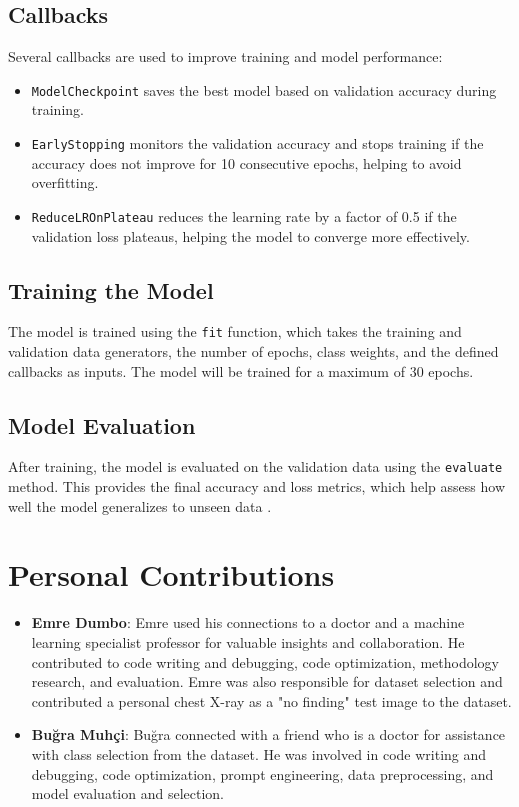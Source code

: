 \documentclass[journal]{IEEEtran}
\begin{document}
\subsection{Callbacks}

Several callbacks are used to improve training and model performance:

\begin{itemize}
    \item \texttt{ModelCheckpoint} saves the best model based on validation accuracy during training.
    \item \texttt{EarlyStopping} monitors the validation accuracy and stops training if the accuracy does not improve for 10 consecutive epochs, helping to avoid overfitting.
    \item \texttt{ReduceLROnPlateau} reduces the learning rate by a factor of 0.5 if the validation loss plateaus, helping the model to converge more effectively.
\end{itemize}

\subsection{Training the Model}

The model is trained using the \texttt{fit} function, which takes the training and validation data generators, the number of epochs, class weights, and the defined callbacks as inputs. The model will be trained for a maximum of 30 epochs.

\subsection{Model Evaluation}

After training, the model is evaluated on the validation data using the \texttt{evaluate} method. This provides the final accuracy and loss metrics, which help assess how well the model generalizes to unseen data \cite{google-drive}.

\section{Personal Contributions}

\begin{itemize}
    \item \textbf{Emre Dumbo}: Emre used his connections to a doctor and a machine learning specialist professor for valuable insights and collaboration. He contributed to code writing and debugging, code optimization, methodology research, and evaluation. Emre was also responsible for dataset selection and contributed a personal chest X-ray as a "no finding" test image to the dataset.
    
    \item \textbf{Bu\u{g}ra Muh\c{c}i}: Bu\u{g}ra connected with a friend who is a doctor for assistance with class selection from the dataset. He was involved in code writing and debugging, code optimization, prompt engineering, data preprocessing, and model evaluation and selection.
\end{itemize}
\end{document}
